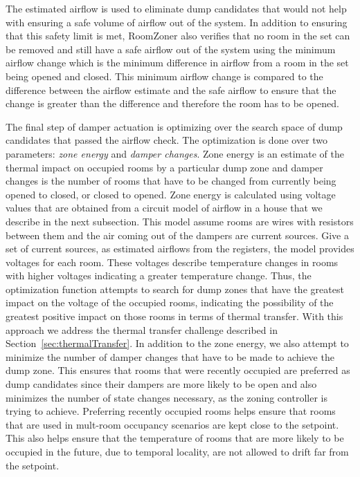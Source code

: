 The estimated airflow is used to eliminate dump candidates that would not help
with ensuring a safe volume of airflow out of the system. In addition to
ensuring that this safety limit is met, RoomZoner also verifies that no
room in the set can be removed and still have a safe airflow out of the system
using the minimum airflow change which is the minimum difference in airflow from
a room in the set being opened and closed. This minimum airflow change is
compared to the difference between the airflow estimate and the safe airflow to
ensure that the change is greater than the difference and therefore the room has
to be opened.

The final step of damper actuation is optimizing over the search space of dump
candidates that passed the airflow check. The optimization is done over two
parameters: {\em zone energy} and {\em damper changes}. Zone energy is an
estimate of the thermal impact on occupied rooms by a particular dump zone and
damper changes is the number of rooms that have to be changed from currently
being opened to closed, or closed to opened. Zone energy is calculated using
voltage values that are obtained from a circuit model of airflow in a house that
we describe in the next subsection. This model assume rooms are wires with
resistors between them and the air coming out of the dampers are current
sources. Give a set of current sources, as estimated airflows from the
registers, the model provides voltages for each room. These voltages describe
temperature changes in rooms with higher voltages indicating a greater
temperature change. Thus, the optimization function attempts to search for dump
zones that have the greatest impact on the voltage of the occupied rooms,
indicating the possibility of the greatest positive impact on those rooms in
terms of thermal transfer. With this approach we address the thermal transfer
challenge described in Section~\ref{sec:thermalTransfer}. In addition to the
zone energy, we also attempt to minimize the number of damper changes that have
to be made to achieve the dump zone. This ensures that rooms that were recently
occupied are preferred as dump candidates since their dampers are more likely to
be open and also minimizes the number of state changes necessary, as the zoning
controller is trying to achieve. Preferring recently occupied rooms helps ensure
that rooms that are used in mult-room occupancy scenarios are kept close to the
setpoint. This also helps ensure that the temperature of rooms that are more
likely to be occupied in the future, due to temporal locality, are not allowed
to drift far from the setpoint.

